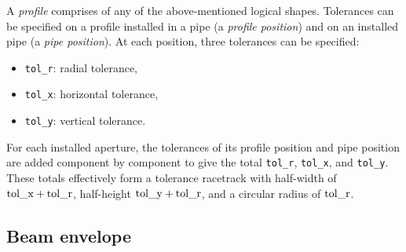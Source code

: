 A \emph{profile} comprises of any of the above-mentioned logical shapes.
Tolerances can be specified on a profile installed in a pipe (a \emph{profile position})
and on an installed pipe (a \emph{pipe position}).
At each position, three tolerances can be specified:
\begin{itemize}
    \item \lstinline|tol_r|: radial tolerance,
    \item \lstinline|tol_x|: horizontal tolerance,
    \item \lstinline|tol_y|: vertical tolerance.
\end{itemize}
For each installed aperture, the tolerances of its profile position and pipe position are
added component by component to give the total \lstinline|tol_r|, \lstinline|tol_x|,
and \lstinline|tol_y|.
These totals effectively form a tolerance racetrack with half-width of
$\text{\lstinline|tol_x|} + \text{\lstinline|tol_r|}$, half-height
$\text{\lstinline|tol_y|} + \text{\lstinline|tol_r|}$, and a circular radius of
$\text{\lstinline|tol_r|}$.

%
%

\subsection{Beam envelope}\label{subsec:apertures-beam-envelope}

